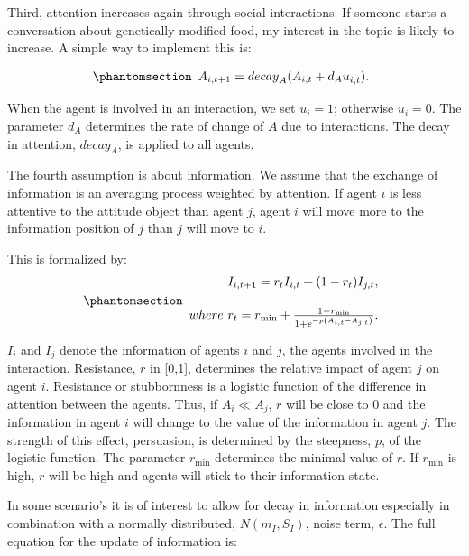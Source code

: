 \documentclass[
  a4paper,
  DIV=11,
  numbers=noendperiod,
  oneside]{scrreprt}
\begin{document}
Third, attention increases again through social interactions. If someone
starts a conversation about genetically modified food, my interest in
the topic is likely to increase. A simple way to implement this is:

\begin{equation}\phantomsection\label{eq-ch7-5-old-54}{\begin{array}{r}
A_{i,t+1}={decay}_A(A_{i,t}+{d_Au}_{i,t}).
\end{array}}\end{equation}

When the agent is involved in an interaction, we set \(u_{i} = 1\);
otherwise \(u_{i} = 0\). The parameter \(d_{A}\) determines the rate of
change of \(A\) due to interactions. The decay in attention,
\({decay}_A\), is applied to all agents.

The fourth assumption is about information. We assume that the exchange
of information is an averaging process weighted by attention. If agent
\(i\) is less attentive to the attitude object than agent \(j\), agent
\(i\) will move more to the information position of \(j\) than \(j\)
will move to \(i\).

This is formalized by:
\begin{equation}\phantomsection\label{eq-ch7-6-old-55}{\begin{array}{r}
I_{i,t+1}=r_{t}I_{i,t}+(1-r_{t}) I_{j,t},\\ 
\\[0.2em]
where\ r_{t} = r_{\min} + \frac{1 - r_{\min}}{1 + e^{- p\left( A_{i,t} - A_{j,t} \right)}}. \\
\end{array}}\end{equation}

\(I_{i}\) and \(I_{j}\) denote the information of agents \(i\) and
\(j\), the agents involved in the interaction. Resistance, \(r\) in
{[}0,1{]}, determines the relative impact of agent \(j\) on agent \(i\).
Resistance or stubbornness is a logistic function of the difference in
attention between the agents. Thus, if \(A_{i} \ll A_{j}\), \(r\) will
be close to 0 and the information in agent \(i\) will change to the
value of the information in agent \(j\). The strength of this effect,
persuasion, is determined by the steepness, \(p\), of the logistic
function. The parameter \(r_{\min}\) determines the minimal value of
\(r\). If \(r_{\min}\) is high, \(r\) will be high and agents will stick
to their information state.

In some scenario's it is of interest to allow for decay in information
especially in combination with a normally distributed,
\(N(m_{I},S_{I})\), noise term, \(\epsilon\). The full equation for the
update of information is:
\end{document}
